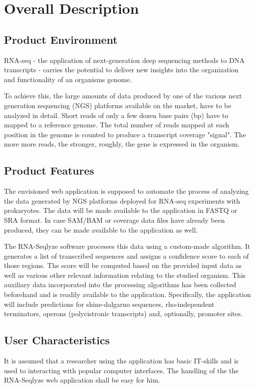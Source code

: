 \documentclass[a4paper]{srs}
\begin{document}
	\section{Overall Description}

\subsection{Product Environment}

RNA-seq - the application of next-generation deep sequencing methods to DNA
transcripts - carries the potential to deliver new insights into the
organization and functionality of an organisms genome.

To achieve this, the large amounts of data produced by one of the various next
generation sequencing (NGS) platforms available on the market, have to be
analyzed in detail. Short reads of only a few dozen base pairs (bp) have to
mapped to a reference genome. The total number of reads mapped at each position
in the genome is counted to produce a transcript coverage "signal". The more
more reads, the stronger, roughly, the gene is expressed in the organism.

\subsection{Product Features}

The envisioned web application is supposed to automate the process of analyzing
the data generated by NGS platforms deployed for RNA-seq experiments with
prokaryotes. The data will be made available to the application in FASTQ
or SRA format. In case SAM/BAM or coverage data files have already been
produced, they can be made available to the application as well.

The RNA-Seqlyze software processes this data using a custom-made algorithm.
It generates a list of transcribed sequences and assigns a confidence score to
each of those regions. The score will be computed based on the provided input
data as well as various other relevant information relating to the studied
organism. This auxiliary data incorporated into the processing algorithms has
been collected beforehand and is readily available to the application.
Specifically, the application will include predictions for shine-dalgarno
sequences, rho-independent terminators, operons (polycistronic transcripts) and,
optionally, promoter sites.

\subsection{User Characteristics}
It is assumed that a researcher using the application has basic
IT-skills and is used to interacting with popular computer interfaces.
The handling of the the RNA-Seqlyze web application shall be easy for him.
\end{document}
